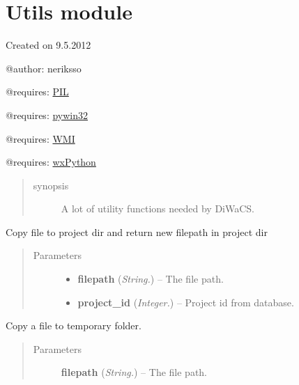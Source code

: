 \documentclass[letterpaper,10pt,english]{sphinxmanual}
\begin{document}
\section{Utils module}
\label{api:utils-module}\label{api:module-utils}
Created on 9.5.2012

@author: neriksso

@requires: \href{http://www.pythonware.com/products/pil/}{PIL}

@requires: \href{https://sourceforge.net/projects/pywin32/}{pywin32}

@requires: \href{https://pypi.python.org/pypi/WMI/}{WMI}

@requires: \href{http://www.wxpython.org/}{wxPython}
\begin{quote}\begin{description}
\item[{synopsis}] \leavevmode
A lot of utility functions needed by DiWaCS.

\end{description}\end{quote}

\begin{fulllineitems}
\label{api:utils.CopyFileToProject}
Copy file to project dir and return new filepath in project dir
\begin{quote}\begin{description}
\item[{Parameters}] \leavevmode\begin{itemize}
\item {} 
\textbf{filepath} (\emph{String.}) -- The file path.

\item {} 
\textbf{project\_id} (\emph{Integer.}) -- Project id from database.

\end{itemize}

\end{description}\end{quote}

\end{fulllineitems}


\begin{fulllineitems}
\label{api:utils.CopyToTemp}
Copy a file to temporary folder.
\begin{quote}\begin{description}
\item[{Parameters}] \leavevmode
\textbf{filepath} (\emph{String.}) -- The file path.

\end{description}\end{quote}

\end{fulllineitems}
\end{document}
